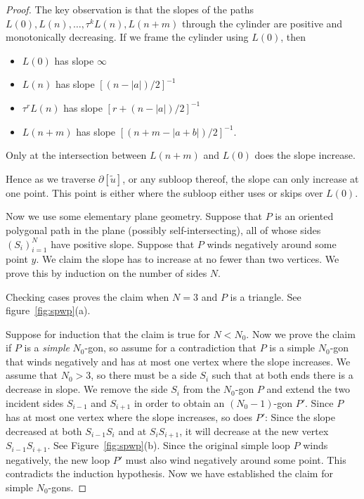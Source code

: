 \documentclass[12pt]{amsart}
\begin{document}
\begin{proof}
  The key observation is that the slopes of the paths $L(0),
  L(n),\dots,\tau^k L(n), L(n+m)$ through the cylinder are positive
  and monotonically decreasing. If we frame the cylinder using $L(0)$,
  then
  \begin{itemize}
  \item $L(0)$ has slope $\infty$
  \item $L(n)$ has slope $[(n-|a|)/2]^{-1}$
  \item $\tau^r L(n)$ has slope $[r+(n-|a|)/2]^{-1}$
  \item $L(n+m)$ has slope $[(n+m-|a+b|)/2]^{-1}$.
  \end{itemize}
  Only at the intersection between $L(n+m)$ and $L(0)$ does the slope
  increase.

  Hence as we traverse $\partial[\tilde{u}]$, or any subloop thereof,
  the slope can only increase at one point. This point is either where
  the subloop either uses or skips over $L(0)$.

  Now we use some elementary plane geometry. Suppose that $P$ is an
  oriented polygonal path in the plane (possibly self-intersecting),
  all of whose sides $(S_i)_{i=1}^N$ have positive slope. Suppose that
  $P$ winds negatively around some point $y$. 
We claim the slope has to increase at no fewer than two vertices. We prove this by induction on the number of sides $N$.

Checking cases proves the claim when $N=3$ and $P$ is a
  triangle. See figure~\ref{fig:spwp}(a).

  Suppose
  for induction that the claim is true for $N < N_0$. Now we prove the claim if $P$ is a \emph{simple} $N_0$-gon, so assume for a contradiction that $P$ is a simple $N_0$-gon that winds negatively and has at most one vertex where the slope increases. We assume that $N_0 > 3$, so there must be a side $S_i$ such that at both ends there is a decrease in slope. We remove the
  side $S_i$ from the $N_0$-gon $P$ and extend the two incident sides
  $S_{i-1}$ and $S_{i+1}$ in order to obtain an $(N_0-1)$-gon $P'$. Since $P$ has at most one vertex where the slope increases, so does $P'$: Since the slope decreased at both $S_{i-1}S_i$ and at
  $S_iS_{i+1}$, it will decrease at the new vertex
  $S_{i-1}S_{i+1}$. See Figure~\ref{fig:spwp}(b). Since the original simple loop $P$ winds
  negatively, the new loop $P'$ must also wind negatively around some point. This
  contradicts the induction hypothesis. Now we have established the claim for simple $N_0$-gons.


\end{proof}
\end{document}
